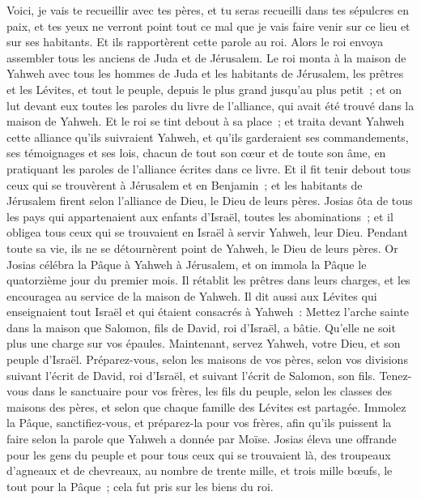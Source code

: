 \begin{multicols}{2}
Voici, je vais te recueillir avec tes pères, et tu seras recueilli dans tes sépulcres en paix, et tes yeux ne verront point tout ce mal que je vais faire venir sur ce lieu et sur ses habitants. Et ils rapportèrent cette parole au roi.
Alors le roi envoya assembler tous les anciens de Juda et de Jérusalem.
Le roi monta à la maison de Yahweh avec tous les hommes de Juda et les habitants de Jérusalem, les prêtres et les Lévites, et tout le peuple, depuis le plus grand jusqu'au plus petit~; et on lut devant eux toutes les paroles du livre de l'alliance, qui avait été trouvé dans la maison de Yahweh.
Et le roi se tint debout à sa place~; et traita devant Yahweh cette alliance qu'ils suivraient Yahweh, et qu'ils garderaient ses commandements, ses témoignages et ses lois, chacun de tout son cœur et de toute son âme, en pratiquant les paroles de l'alliance écrites dans ce livre.
Et il fit tenir debout tous ceux qui se trouvèrent à Jérusalem et en Benjamin~; et les habitants de Jérusalem firent selon l'alliance de Dieu, le Dieu de leurs pères.
Josias ôta de tous les pays qui appartenaient aux enfants d'Israël, toutes les abominations~; et il obligea tous ceux qui se trouvaient en Israël à servir Yahweh, leur Dieu. Pendant toute sa vie, ils ne se détournèrent point de Yahweh, le Dieu de leurs pères.
\VerseOne{}Or Josias célébra la Pâque à Yahweh à Jérusalem, et on immola la Pâque le quatorzième jour du premier mois.
Il rétablit les prêtres dans leurs charges, et les encouragea au service de la maison de Yahweh.
Il dit aussi aux Lévites qui enseignaient tout Israël et qui étaient consacrés à Yahweh~: Mettez l'arche sainte dans la maison que Salomon, fils de David, roi d'Israël, a bâtie. Qu'elle ne soit plus une charge sur vos épaules. Maintenant, servez Yahweh, votre Dieu, et son peuple d'Israël.
Préparez-vous, selon les maisons de vos pères, selon vos divisions suivant l'écrit de David, roi d'Israël, et suivant l'écrit de Salomon, son fils.
Tenez-vous dans le sanctuaire pour vos frères, les fils du peuple, selon les classes des maisons des pères, et selon que chaque famille des Lévites est partagée.
Immolez la Pâque, sanctifiez-vous, et préparez-la pour vos frères, afin qu'ils puissent la faire selon la parole que Yahweh a donnée par Moïse.
Josias éleva une offrande pour les gens du peuple et pour tous ceux qui se trouvaient là, des troupeaux d'agneaux et de chevreaux, au nombre de trente mille, et trois mille bœufs, le tout pour la Pâque~; cela fut pris sur les biens du roi.

\end{multicols}
